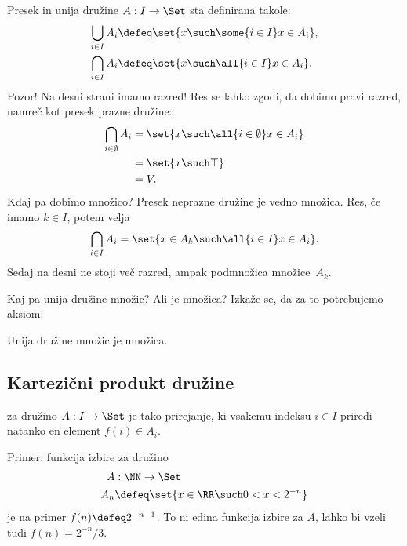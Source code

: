 Presek in unija družine $A : I \to \Set$ sta definirana takole:
%
\begin{align*}
  \bigcup_{i \in I} A_i &\defeq \set{ x \such \some{i \in I} x \in A_i },
  \\
  \bigcap_{i \in I} A_i &\defeq \set{ x \such \all{ i \in I} x \in A_i }.
\end{align*}
%
Pozor! Na desni strani imamo razred! Res se lahko zgodi, da dobimo pravi razred, namreč
kot presek prazne družine:
%
\begin{align*}
  \bigcap_{i \in \emptyset} A_i
  &= \set{ x \such \all{ i \in \emptyset} x \in A_i } \\
  &= \set { x \such \top } \\
  &= V.
\end{align*}
%
Kdaj pa dobimo množico? Presek neprazne družine je vedno množica. Res, če imamo
$k \in I$, potem velja
%
\begin{equation*}
    \bigcap_{i \in I} A_i = \set{ x \in A_k \such \all{i \in I} x \in A_i}.
\end{equation*}
%
Sedaj na desni ne stoji več razred, ampak podmnožica množice~$A_k$.

Kaj pa unija družine množic? Ali je množica? Izkaže se, da za to potrebujemo aksiom:

\begin{aksiom}
  Unija družine množic je množica.
\end{aksiom}


\subsection{Kartezični produkt družine}

\begin{definicija}
   za družino $A : I \to \Set$ je tako prirejanje, ki vsakemu indeksu $i \in I$ priredi natanko en element $f(i) \in A_i$.
 \end{definicija}

 \begin{zgled}
   Primer: funkcija izbire za družino
   \begin{align*}
   A &: \NN \to \Set \\
   A_n &\defeq \set{ x \in \RR \such 0 < x < 2^{-n} }
   \end{align*}
   je na primer $f(n) \defeq 2^{-n - 1}$. To ni edina funkcija izbire za $A$, lahko bi vzeli tudi $f(n) = 2^{-n} / 3$.
 \end{zgled}

